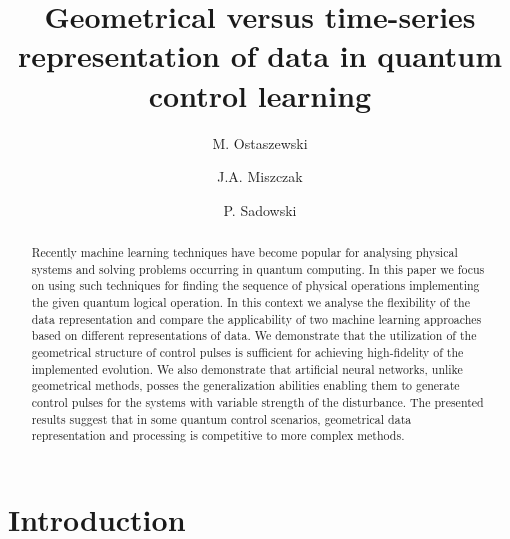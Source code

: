 \documentclass[aps,pra,showkeys,showpacs,notitlepage,superscriptaddress]{revtex4-1}
\newcommand{\1}{{\rm 1\hspace{-0.9mm}l}}
\begin{document}
  
  
  \title{Geometrical versus time-series representation of data in quantum control learning}

  \author{M. Ostaszewski}
  \author{J.A. Miszczak}
  \author{P. Sadowski}



\begin{abstract}
    Recently machine learning techniques have become popular for analysing physical systems and solving problems occurring in quantum computing. In this paper we focus on using such techniques for finding the sequence of physical operations implementing the given quantum logical operation. In this context we analyse the flexibility of the data representation and compare the applicability of two machine learning approaches based on different representations of data. We demonstrate that the utilization of the geometrical structure of control pulses is sufficient for achieving high-fidelity of the implemented evolution. We also demonstrate that artificial neural networks, unlike geometrical methods, posses the generalization abilities enabling them to generate control pulses for the systems with variable strength of the disturbance. The presented results suggest that in some quantum control scenarios, geometrical data representation and processing is competitive to more complex methods.
\end{abstract}

\maketitle



\section{Introduction}
\end{document}
